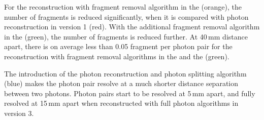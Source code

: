 

For the reconstruction with fragment removal algorithm in the \ECAL (orange), the number of fragments is reduced significantly, when it is compared with photon reconstruction in \pandora version 1 (red). With the additional fragment removal algorithm in the \HCAL (green), the number of fragments is reduced further. At 40\,mm distance apart,  there is on average less than 0.05 fragment per photon pair for the reconstruction with fragment removal algorithms in the \ECAL and the \HCAL  (green).

The introduction of the photon reconstruction and photon splitting algorithm (blue) makes the photon pair resolve at a much shorter distance separation between two photons. Photon pairs start to be resolved at 5\,mm apart, and fully resolved at 15\,mm apart when reconstructed with full photon algorithms in \pandora version 3.


